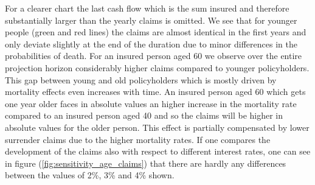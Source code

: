 For a clearer chart the last cash flow which is the sum insured and therefore substantially larger than the yearly claims is omitted. We see that for younger people (green and red lines) the claims are almost identical in the first years and only deviate slightly at the end of the duration due to minor differences in the probabilities of death. For an insured person aged 60 we observe over the entire projection horizon considerably higher claims compared to younger policyholders. This gap between young and old policyholders which is mostly driven by mortality effects even increases with time. An insured person aged 60 which gets one year older faces in absolute values an higher increase in the mortality rate compared to an insured person aged 40 and so the claims will be higher in absolute values for the older person. This effect is partially compensated by lower surrender claims due to the higher mortality rates. If one compares the development of the claims also with respect to different interest rates, one can see in figure (\ref{fig:sensitivity_age_claims}) that there are hardly any differences between the values of 2\%, 3\% and 4\% shown. 

